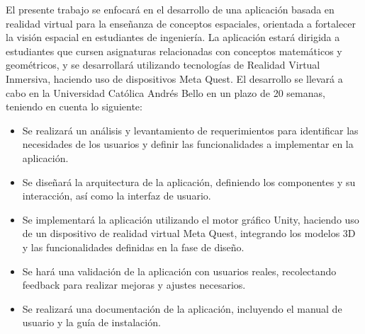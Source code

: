 
El presente trabajo se enfocará en el desarrollo de una aplicación basada en realidad virtual para la enseñanza de conceptos espaciales, orientada a fortalecer la visión espacial en estudiantes de ingeniería. La aplicación estará dirigida a estudiantes que cursen asignaturas relacionadas con conceptos matemáticos y geométricos, y se desarrollará utilizando tecnologías de Realidad Virtual Inmersiva, haciendo uso de dispositivos Meta Quest. El desarrollo se llevará a cabo en la Universidad Católica Andrés Bello en un plazo de 20 semanas, teniendo en cuenta lo siguiente:

\begin{itemize}
  \item Se realizará un análisis y levantamiento de requerimientos para identificar las necesidades de los usuarios y definir las funcionalidades a implementar en la aplicación.
  \item Se diseñará la arquitectura de la aplicación, definiendo los componentes y su interacción, así como la interfaz de usuario.
  \item Se implementará la aplicación utilizando el motor gráfico Unity, haciendo uso de un dispositivo de realidad virtual Meta Quest, integrando los modelos 3D y las funcionalidades definidas en la fase de diseño.
  \item Se hará una validación de la aplicación con usuarios reales, recolectando feedback para realizar mejoras y ajustes necesarios.
  \item Se realizará una documentación de la aplicación, incluyendo el manual de usuario y la guía de instalación.
\end{itemize}

\clearpage
